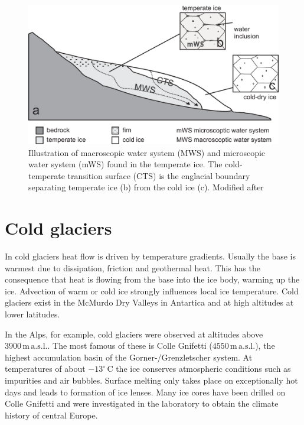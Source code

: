 \documentclass[11pt,a4paper,halfparskip]{scrartcl}
\newcommand{\unit}[1]{\ensuremath{\,\mathrm{#1}}}
\newcommand{\cels}[1]{\ensuremath{#1^{\circ}\,\mathrm{C}}}
\begin{document}
 \begin{figure}[tbhp]
  \centering
  \includegraphics[width=12.cm]{figures/mws}  
  \caption{Illustration of macroscopic water system (MWS) and microscopic water system (mWS) found in the temperate ice. The cold-temperate transition surface (CTS) is the englacial boundary separating temperate ice (b) from the cold ice (c). Modified after \cite{Gusmeroli2010}}
  \label{fig:mws}
\end{figure}



\section{Cold glaciers}
\label{sec:cold-glaciers}

In cold glaciers heat flow is driven by temperature gradients.  Usually the
base is warmest due to dissipation, friction and geothermal heat.  This has
the consequence that heat is flowing from the base into the ice body, warming
up the ice.  Advection of warm or cold ice strongly influences local ice
temperature. Cold glaciers exist in the McMurdo Dry Valleys in Antartica and at high altitudes at lower latitudes. 

In the Alps, for example, cold glaciers were observed at altitudes above $3900\unit{m}\unit{a.s.l.}$.  The most famous of these is Colle
Gnifetti ($4550 \unit{m}\unit{a.s.l.}$), the highest accumulation basin of the
Gorner-/Grenzletscher system.  At temperatures of about \cels{-13} the ice
conserves atmospheric conditions such as impurities and air bubbles.  Surface
melting only takes place on exceptionally hot days and leads to formation of
ice lenses.  Many ice cores have been drilled on Colle Gnifetti and were
investigated in the laboratory to obtain the climate history of central Europe.
\end{document}
